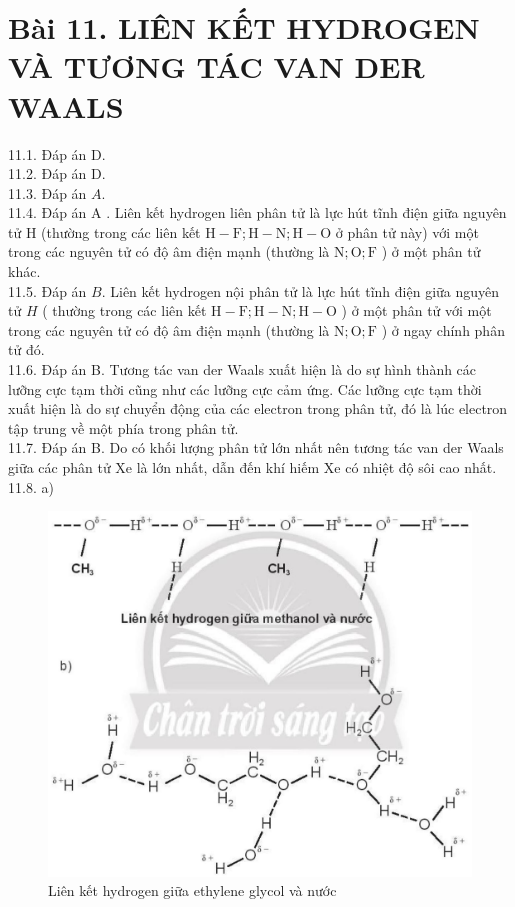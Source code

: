\documentclass[10pt]{article}
\begin{document}
\section*{Bài 11. LIÊN KẾT HYDROGEN VÀ TƯƠNG TÁC VAN DER WAALS}
11.1. Đáp án D.\\
11.2. Đáp án D.\\
11.3. Đáp án $A$.\\
11.4. Đáp án A . Liên kết hydrogen liên phân tử là lực hút tĩnh điện giữa nguyên tử H (thường trong các liên kết $\mathrm{H}-\mathrm{F} ; \mathrm{H}-\mathrm{N} ; \mathrm{H}-\mathrm{O}$ ở phân tử này) với một trong các nguyên tử có độ âm điện mạnh (thường là $\mathrm{N} ; \mathrm{O} ; \mathrm{F}$ ) ở một phân tử khác.\\
11.5. Đáp án $B$. Liên kết hydrogen nội phân tử là lực hút tĩnh điện giữa nguyên tử $H$ ( thường trong các liên kết $\mathrm{H}-\mathrm{F} ; \mathrm{H}-\mathrm{N} ; \mathrm{H}-\mathrm{O}$ ) ở một phân tử với một trong các nguyên tử có độ âm điện mạnh (thường là $\mathrm{N} ; \mathrm{O} ; \mathrm{F}$ ) ở ngay chính phân tử đó.\\
11.6. Đáp án B. Tương tác van der Waals xuất hiện là do sự hình thành các lưỡng cực tạm thời cũng như các lưỡng cực cảm ứng. Các lưỡng cực tạm thời xuất hiện là do sự chuyển động của các electron trong phân tử, đó là lúc electron tập trung về một phía trong phân tử.\\
11.7. Đáp án B. Do có khối lượng phân tử lớn nhất nên tương tác van der Waals giữa các phân tử Xe là lớn nhất, dẫn đến khí hiếm Xe có nhiệt độ sôi cao nhất.\\
11.8. a)

\begin{figure}[h]
\begin{center}
  \includegraphics[width=\textwidth]{2025_10_23_57761e23b8c46a11c3efg-29}
\captionsetup{labelformat=empty}
\caption{Liên kết hydrogen giữa ethylene glycol và nước}
\end{center}
\end{figure}
\end{document}
